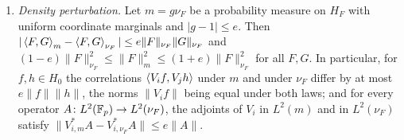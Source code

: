 \begin{lemma}
\begin{enumerate}[label=\textup{(\alph*)}]
\begin{gather*}
  A_1^*A_1=A_2^*A_2=qI,\qquad A_3^*A_3=\frac{1-2q-q^2}{p-1}I\preceq qI,\qquad
  A_1^*A_2=-\frac q{p-1}I+\frac P{(p-1)(p-2)},\\
  A_1^*A_3=-\frac q{(p-1)(p-2)}I+\frac q{p-1}P,\qquad
  A_2^*A_3=\frac q{(p-1)(p-2)}I+\frac q{p-1}P,\\
  V_1^*A_3=-\frac q{p-1}I+\frac P{(p-1)(p-2)},\qquad
  V_2^*A_3=-\frac q{p-1}I-\frac P{(p-1)(p-2)},\\
  V_0^*A_1=-\frac{I+P}{p-1},\qquad V_0^*A_2=\frac I{(p-1)(p-2)}-\frac P{p-1},\qquad
  V_0^*A_3=\frac{2I}{p(p-1)(p-2)} .
 \end{gather*}
 Hence, for $\xi\in\R^3$ and $A_\xi=\xi_1A_1+\xi_2A_2+\xi_3A_3$, $V_0^*A_\xi=a_\xi I+b_\xi P$
 on $H_0$ with
 \[
  a_\xi=-\frac{\xi_1q}{1-q}+\frac{\xi_2q^2}{(1-q)(1-2q)}+\frac{2\xi_3q^3}{(1-q)(1-2q)},
  \qquad b_\xi=-\frac{(\xi_1+\xi_2)q}{1-q},
 \]
 and $\|(A_1,A_2,A_3)\|\le r\gamma$ on $H_0^3$, with $\gamma^2=1+q(1+2r)/(1-2q)$.
\item\label{it:paley:perturb} \emph{Density perturbation.} Let $m=g\nu_F$ be a
 probability measure on $H_F$ with uniform coordinate marginals and
 $|g-1|\le e$. Then $|\left\langle F,G\right\rangle_m-\left\langle F,G\right\rangle_{\nu_F}|\le e\|F\|_{\nu_F}\|G\|_{\nu_F}$ and
 $(1-e)\|F\|^2_{\nu_F}\le\|F\|_m^2\le(1+e)\|F\|^2_{\nu_F}$ for all $F,G$. In
 particular, for $f,h\in H_0$ the correlations $\left\langle V_if,V_jh\right\rangle$ under $m$ and
 under $\nu_F$ differ by at most $e\|f\|\|h\|$, the norms $\|V_if\|$ being equal
 under both laws; and for every operator $A\colon L^2(\mathbb F_p)\to L^2(\nu_F)$, the
 adjoints of $V_i$ in $L^2(m)$ and in $L^2(\nu_F)$ satisfy
 $\|V_{i,m}^*A-V_{i,\nu_F}^*A\|\le e\|A\|$.
\end{enumerate}
\end{lemma}

